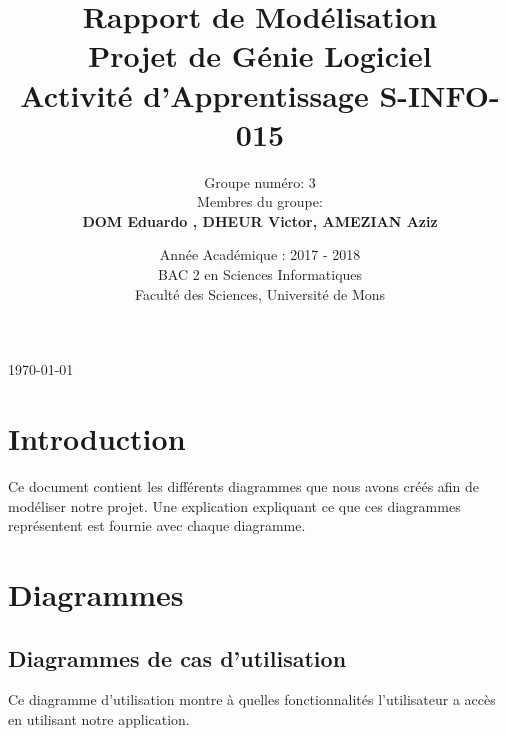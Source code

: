 \documentclass[]{article}
\begin{document}

\title{
{\Huge Rapport de Modélisation}\\
Projet de Génie Logiciel\\
\smallskip
{\small Activité d'Apprentissage \textsf{S-INFO-015}}\\
}

\author{Groupe numéro: 3\\
Membres du groupe:\\
\textbf{DOM Eduardo , DHEUR Victor, AMEZIAN Aziz}\\
}


\date{Année Académique : 2017 - 2018\\
BAC 2 en Sciences Informatiques\\
\vspace{1cm}
Faculté des Sciences, Université de Mons}

\maketitle              %

\bigskip
\begin{center} \today \end{center}

\newpage
\section{Introduction}\label{sec:intro}

Ce document contient les différents diagrammes que nous avons créés afin de modéliser notre projet. Une explication expliquant ce que ces diagrammes représentent est fournie avec chaque diagramme.

\section{Diagrammes}

\subsection{Diagrammes de cas d'utilisation}

Ce diagramme d'utilisation montre à quelles fonctionnalités l'utilisateur a accès en utilisant notre application.
\end{document}
